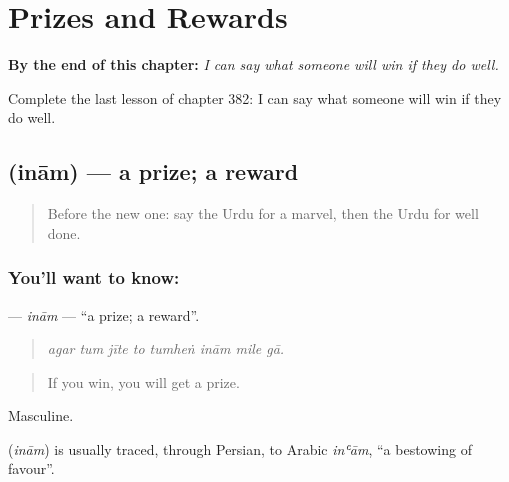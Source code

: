 
\chapter{Prizes and Rewards}
\label{ch:ur-prizes-and-rewards}

\begin{chapteropening}
\textbf{By the end of this chapter:} \emph{I can say what someone will win if they do well.}

Complete the last lesson of chapter 382: I can say what someone will win if they do well.
\end{chapteropening}

\section[\texorpdfstring{\ur{انعام} (inām)}{انعام (inām)}]{ (inām) — a prize; a reward}

\label{lesson:UR-C382-inam}



\begin{quote}
Before the new one: say the Urdu for a marvel, then the Urdu for well done.
\end{quote}

\subsection*{You'll want to know: }
\textbf{} — \emph{inām} — \textquotedblleft{}a prize; a reward\textquotedblright{}.

\begin{quote}
       
\end{quote}

\begin{quote}
\emph{agar tum jīte to tumheṅ inām mile gā.}
\end{quote}

\begin{quote}
If you win, you will get a prize.
\end{quote}

Masculine.

\begin{cousinweb}
\textbf{} (\emph{inām}) is usually traced, through Persian, to Arabic \emph{inʿām}, \textquotedblleft{}a bestowing of favour\textquotedblright{}.
\end{cousinweb}

